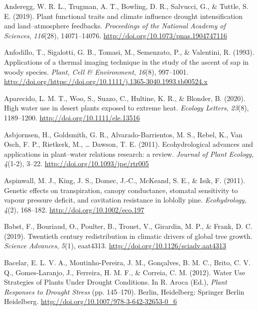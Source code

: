 \documentclass[11pt,twoside]{reedthesis}
\begin{document}
\hypertarget{ref-anderegg_plant_2019}{}
Anderegg, W. R. L., Trugman, A. T., Bowling, D. R., Salvucci, G., \&
Tuttle, S. E. (2019). Plant functional traits and climate influence
drought intensification and land--atmosphere feedbacks.
\emph{Proceedings of the National Academy of Sciences}, \emph{116}(28),
14071--14076. \url{http://doi.org/10.1073/pnas.1904747116}

\hypertarget{ref-Anfodillo1993}{}
Anfodillo, T., Sigalotti, G. B., Tomasi, M., Semenzato, P., \&
Valentini, R. (1993). Applications of a thermal imaging technique in the
study of the ascent of sap in woody species. \emph{Plant, Cell \&
Environment}, \emph{16}(8), 997--1001.
\url{http://doi.org/https://doi.org/10.1111/j.1365-3040.1993.tb00524.x}

\hypertarget{ref-aparecido_high_2020}{}
Aparecido, L. M. T., Woo, S., Suazo, C., Hultine, K. R., \& Blonder, B.
(2020). High water use in desert plants exposed to extreme heat.
\emph{Ecology Letters}, \emph{23}(8), 1189--1200.
\url{http://doi.org/10.1111/ele.13516}

\hypertarget{ref-Asbjornsen2011}{}
Asbjornsen, H., Goldsmith, G. R., Alvarado-Barrientos, M. S., Rebel, K.,
Van Osch, F. P., Rietkerk, M., \ldots{} Dawson, T. E. (2011).
Ecohydrological advances and applications in plant--water relations
research: a review. \emph{Journal of Plant Ecology}, \emph{4}(1-2),
3--22. \url{http://doi.org/10.1093/jpe/rtr005}

\hypertarget{ref-aspinwall_genetic_2011}{}
Aspinwall, M. J., King, J. S., Domec, J.-C., McKeand, S. E., \& Isik, F.
(2011). Genetic effects on transpiration, canopy conductance, stomatal
sensitivity to vapour pressure deficit, and cavitation resistance in
loblolly pine. \emph{Ecohydrology}, \emph{4}(2), 168--182.
\url{http://doi.org/10.1002/eco.197}

\hypertarget{ref-babst_twentieth_2019}{}
Babst, F., Bouriaud, O., Poulter, B., Trouet, V., Girardin, M. P., \&
Frank, D. C. (2019). Twentieth century redistribution in climatic
drivers of global tree growth. \emph{Science Advances}, \emph{5}(1),
eaat4313. \url{http://doi.org/10.1126/sciadv.aat4313}

\hypertarget{ref-Bacelar2012}{}
Bacelar, E. L. V. A., Moutinho-Pereira, J. M., Gonçalves, B. M. C.,
Brito, C. V. Q., Gomes-Laranjo, J., Ferreira, H. M. F., \& Correia, C.
M. (2012). Water Use Strategies of Plants Under Drought Conditions. In
R. Aroca (Ed.), \emph{Plant Responses to Drought Stress} (pp. 145--170).
Berlin, Heidelberg: Springer Berlin Heidelberg.
\url{http://doi.org/10.1007/978-3-642-32653-0_6}
\end{document}
